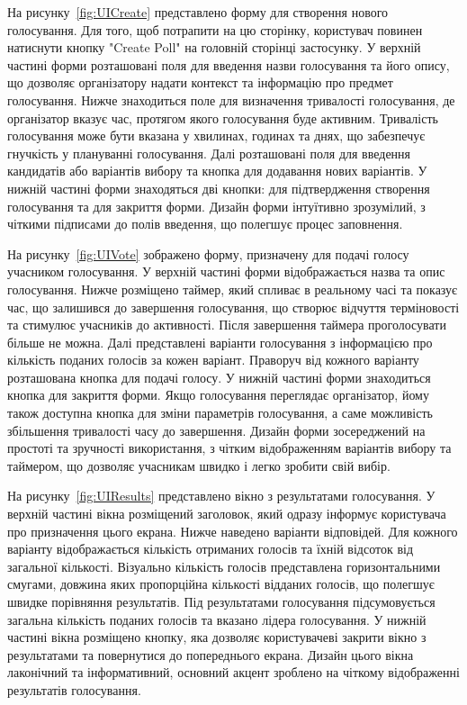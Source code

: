 \documentclass[14pt]{extreport}
\begin{document}
  На рисунку~\ref{fig:UICreate} представлено форму для створення нового голосування. Для того, щоб потрапити на цю сторінку, користувач повинен натиснути кнопку "Create Poll" на головній сторінці застосунку. У верхній частині форми розташовані поля для введення назви голосування та його опису, що дозволяє організатору надати контекст та інформацію про предмет голосування. Нижче знаходиться поле для визначення тривалості голосування, де організатор вказує час, протягом якого голосування буде активним. Тривалість голосування може бути вказана у хвилинах, годинах та днях, що забезпечує гнучкість у плануванні голосування. Далі розташовані поля для введення кандидатів або варіантів вибору та кнопка для додавання нових варіантів. У нижній частині форми знаходяться дві кнопки: для підтвердження створення голосування та для закриття форми. Дизайн форми інтуїтивно зрозумілий, з чіткими підписами до полів введення, що полегшує процес заповнення.

  На рисунку~\ref{fig:UIVote} зображено форму, призначену для подачі голосу учасником голосування. У верхній частині форми відображається назва та опис голосування. Нижче розміщено таймер, який спливає в реальному часі та показує час, що залишився до завершення голосування, що створює відчуття терміновості та стимулює учасників до активності. Після завершення таймера проголосувати більше не можна. Далі представлені варіанти голосування з інформацією про кількість поданих голосів за кожен варіант. Праворуч від кожного варіанту розташована кнопка для подачі голосу. У нижній частині форми знаходиться кнопка для закриття форми. Якщо голосування переглядає організатор, йому також доступна кнопка для зміни параметрів голосування, а саме можливість збільшення тривалості часу до завершення. Дизайн форми зосереджений на простоті та зручності використання, з чітким відображенням варіантів вибору та таймером, що дозволяє учасникам швидко і легко зробити свій вибір.

  На рисунку~\ref{fig:UIResults} представлено вікно з результатами голосування. У верхній частині вікна розміщений заголовок, який одразу інформує користувача про призначення цього екрана. Нижче наведено варіанти відповідей. Для кожного варіанту відображається кількість отриманих голосів та їхній відсоток від загальної кількості. Візуально кількість голосів представлена горизонтальними смугами, довжина яких пропорційна кількості відданих голосів, що полегшує швидке порівняння результатів. Під результатами голосування підсумовується загальна кількість поданих голосів та вказано лідера голосування. У нижній частині вікна розміщено кнопку, яка дозволяє користувачеві закрити вікно з результатами та повернутися до попереднього екрана. Дизайн цього вікна лаконічний та інформативний, основний акцент зроблено на чіткому відображенні результатів голосування.
\end{document}
